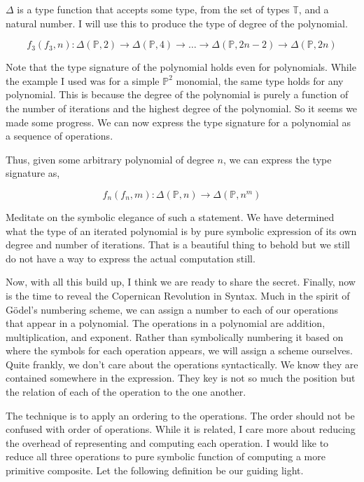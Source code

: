 \documentclass[12pt]{article}
\begin{document}
$\Delta$ is a type function that accepts some type, from the set of types
$\mathbb{T}$, and a natural number. I will use this to produce the type of
degree of the polynomial.

\begin{equation}
    f_3(f_3,n): \Delta(\mathbb{P}, 2) \rightarrow \Delta(\mathbb{P}, 4) \rightarrow \dots \rightarrow  \Delta(\mathbb{P}, 2n-2) \rightarrow \Delta(\mathbb{P}, 2n)
\end{equation}

Note that the type signature of the polynomial holds even for polynomials.
While the example I used was for a simple $\mathbb{P}^2$ monomial, the same
type holds for any polynomial. This is because the degree of the polynomial is
purely a function of the number of iterations and the highest degree of the
polynomial. So it seems we made some progress. We can now express the type
signature for a polynomial as a sequence of operations.

Thus, given some arbitrary polynomial of degree $n$, we can express the type
signature as,

\begin{equation}
    f_n(f_n,m): \Delta(\mathbb{P}, n) \rightarrow \Delta(\mathbb{P}, n^m)
\end{equation}

Meditate on the symbolic elegance of such a statement. We have determined what
the type of an iterated polynomial is by pure symbolic expression of its own
degree and number of iterations. That is a beautiful thing to behold but we
still do not have a way to express the actual computation still.

Now, with all this build up, I think we are ready to share the secret. Finally,
now is the time to reveal the Copernican Revolution in Syntax. Much in the
spirit of G\"odel's numbering scheme, we can assign a number to each of our
operations that appear in a polynomial. The operations in a polynomial are
addition, multiplication, and exponent. Rather than symbolically numbering it
based on where the symbols for each operation appears, we will assign a scheme
ourselves. Quite frankly, we don't care about the operations syntactically. We
know they are contained somewhere in the expression. They key is not so much
the position but the relation of each of the operation to the one another.

The technique is to apply an ordering to the operations. The order should not
be confused with order of operations. While it is related, I care more about
reducing the overhead of representing and computing each operation. I would
like to reduce all three operations to pure symbolic function of computing a
more primitive composite. Let the following definition be our guiding light.
\end{document}
